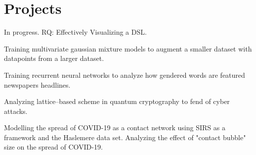 \documentclass[letterpaper]{deedy-resume} %
\begin{document}
\begin{minipage}[t]{0.66\textwidth} %


\section{Projects}

In progress. RQ: Effectively Visualizing a DSL.

\sectionspace %

Training multivariate gaussian mixture models to augment a smaller dataset with datapoints from a larger dataset. 

\sectionspace %


Training recurrent neural networks to analyze how gendered words are featured newspapers headlines.


\vspace{\topsep} %


\sectionspace %


Analyzing lattice–based scheme in quantum cryptography to fend of cyber attacks.

\sectionspace %



Modelling the spread of COVID-19 as a contact network using SIRS as a framework and the Haslemere data set. Analyzing the effect of "contact bubble" size on the spread of COVID-19.

\sectionspace %


\end{minipage}
\end{document}
